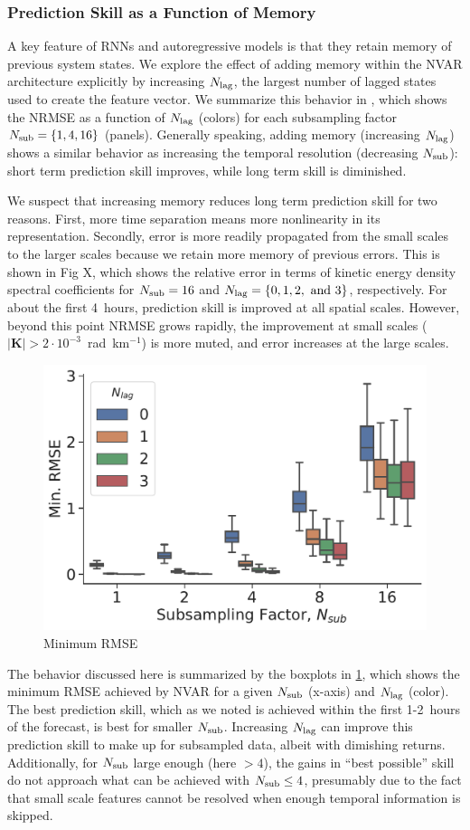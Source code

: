 \subsubsection{Prediction Skill as a Function of Memory}

A key feature of RNNs and autoregressive models is that they retain memory of
previous system states.
We explore the effect of adding memory within the NVAR architecture explicitly
by increasing $N_\text{lag}$, the largest number of lagged states used to create the
feature vector.
We summarize this behavior in , which shows the NRMSE as a
function of $N_\text{lag}$ (colors) for each
subsampling factor $N_\text{sub} = \{1, 4, 16\}$ (panels).
Generally speaking, adding memory (increasing $N_\text{lag}$) shows a similar behavior as increasing the
temporal resolution (decreasing $N_\text{sub}$): short term prediction skill improves,
while long term skill is diminished.

We suspect that increasing memory reduces long term prediction skill for two
reasons.
First, more time separation means more nonlinearity in its representation.
Secondly, error is more readily propagated from the small scales to the larger
scales because we retain more memory of previous errors.
This is shown in Fig X,
which shows the relative error in terms of kinetic energy density spectral coefficients for $N_\text{sub}=16$ and
$N_\text{lag}=\{0, 1,2,\text{ and }3\}$, respectively.
For about the first 4~hours, prediction skill is improved at all spatial scales.
However, beyond this point
NRMSE grows rapidly, the improvement at
small scales ($|\mathbf{K}|>2\cdot10^{-3}$~rad~km$^{-1}$) is more muted,
and error increases at the large scales.

\begin{figure}
    \centering
    \includegraphics[width=.5\textwidth]{../figures/nvar-mrmse-vs-lag-050samples.pdf}
    \caption{Minimum RMSE}
    \label{fig:nvar_min_rmse}
\end{figure}

The behavior discussed here is summarized by the boxplots in
\cref{fig:nvar_min_rmse}, which shows the minimum RMSE achieved by NVAR for a
given $N_\text{sub}$ (x-axis) and $N_\text{lag}$ (color).
The best prediction skill, which as we noted is achieved within the first
1-2~hours of the forecast, is best for smaller $N_\text{sub}$.
Increasing $N_\text{lag}$ can improve this prediction skill to make up for subsampled
data, albeit with dimishing returns.
Additionally, for $N_\text{sub}$ large enough
(here $>4$), the gains in ``best possible'' skill do not approach what can be
achieved with $N_\text{sub}\le 4$, presumably due to the fact that small scale features
cannot be resolved when enough temporal information is skipped.
